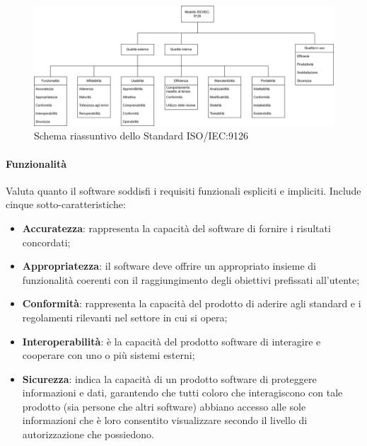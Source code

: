 \documentclass[10pt]{article}
\begin{document}
\begin{justify}
        \begin{figure}[H]
        \centering
        \includegraphics[width=1\textwidth]{Standard9126.png}
        \caption{Schema riassuntivo dello Standard ISO/IEC:9126}
        \end{figure}

            \paragraph{Funzionalità}
            Valuta quanto il software soddisfi i requisiti funzionali espliciti e impliciti. Include cinque sotto-caratteristiche:
            \begin{itemize}
                \item \textbf{Accuratezza}: rappresenta la capacità del software di fornire i risultati concordati;
                \item \textbf{Appropriatezza}: il software deve offrire un appropriato insieme di funzionalità coerenti con il raggiungimento degli obiettivi prefissati all'utente;
                \item \textbf{Conformità}: rappresenta la capacità del prodotto di aderire agli standard e i regolamenti rilevanti nel settore in cui si opera;
                \item \textbf{Interoperabilità}: è la capacità del prodotto software di interagire e cooperare con uno o più sistemi esterni;
                \item \textbf{Sicurezza}: indica la capacità di un prodotto software di proteggere informazioni e dati, garantendo che tutti coloro che interagiscono con tale prodotto (sia persone che altri software) abbiano accesso alle sole informazioni che è loro consentito visualizzare secondo il livello di autorizzazione che possiedono.
            \end{itemize}


\end{justify}
\end{document}
